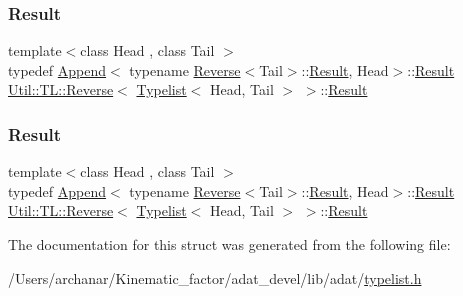 \subsubsection{\texorpdfstring{Result}{Result}\hspace{0.1cm}{\footnotesize\ttfamily [1/2]}}
{\footnotesize\ttfamily template$<$class Head , class Tail $>$ \\
typedef \mbox{\hyperlink{structUtil_1_1TL_1_1Append}{Append}}$<$ typename \mbox{\hyperlink{structUtil_1_1TL_1_1Reverse}{Reverse}}$<$Tail$>$\+::\mbox{\hyperlink{structUtil_1_1TL_1_1Reverse_3_01Typelist_3_01Head_00_01Tail_01_4_01_4_a9886893d82dd4c1124f42d7d45fdbdbd}{Result}}, Head$>$\+::\mbox{\hyperlink{structUtil_1_1TL_1_1Reverse_3_01Typelist_3_01Head_00_01Tail_01_4_01_4_a9886893d82dd4c1124f42d7d45fdbdbd}{Result}} \mbox{\hyperlink{structUtil_1_1TL_1_1Reverse}{Util\+::\+T\+L\+::\+Reverse}}$<$ \mbox{\hyperlink{structUtil_1_1Typelist}{Typelist}}$<$ Head, Tail $>$ $>$\+::\mbox{\hyperlink{structUtil_1_1TL_1_1Reverse_3_01Typelist_3_01Head_00_01Tail_01_4_01_4_a9886893d82dd4c1124f42d7d45fdbdbd}{Result}}}

\mbox{\label{structUtil_1_1TL_1_1Reverse_3_01Typelist_3_01Head_00_01Tail_01_4_01_4_a9886893d82dd4c1124f42d7d45fdbdbd}} 
\subsubsection{\texorpdfstring{Result}{Result}\hspace{0.1cm}{\footnotesize\ttfamily [2/2]}}
{\footnotesize\ttfamily template$<$class Head , class Tail $>$ \\
typedef \mbox{\hyperlink{structUtil_1_1TL_1_1Append}{Append}}$<$ typename \mbox{\hyperlink{structUtil_1_1TL_1_1Reverse}{Reverse}}$<$Tail$>$\+::\mbox{\hyperlink{structUtil_1_1TL_1_1Reverse_3_01Typelist_3_01Head_00_01Tail_01_4_01_4_a9886893d82dd4c1124f42d7d45fdbdbd}{Result}}, Head$>$\+::\mbox{\hyperlink{structUtil_1_1TL_1_1Reverse_3_01Typelist_3_01Head_00_01Tail_01_4_01_4_a9886893d82dd4c1124f42d7d45fdbdbd}{Result}} \mbox{\hyperlink{structUtil_1_1TL_1_1Reverse}{Util\+::\+T\+L\+::\+Reverse}}$<$ \mbox{\hyperlink{structUtil_1_1Typelist}{Typelist}}$<$ Head, Tail $>$ $>$\+::\mbox{\hyperlink{structUtil_1_1TL_1_1Reverse_3_01Typelist_3_01Head_00_01Tail_01_4_01_4_a9886893d82dd4c1124f42d7d45fdbdbd}{Result}}}



The documentation for this struct was generated from the following file\+:\begin{DoxyCompactItemize}
\item 
/\+Users/archanar/\+Kinematic\+\_\+factor/adat\+\_\+devel/lib/adat/\mbox{\hyperlink{lib_2adat_2typelist_8h}{typelist.\+h}}\end{DoxyCompactItemize}
